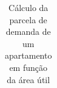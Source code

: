 \documentclass[12pt,openright,oneside,a4paper,brazil]{abntex2}
\begin{document}
\begin{table}[H] %
\centering

        \centering
        \caption{Cálculo da parcela de demanda de um apartamento em função da área útil}
        \label{tab:demanda_apartamento}
        \setlength{\tabcolsep}{9pt} %
        \renewcommand{\arraystretch}{1.2} %
        \vspace{0.15cm}
        \centering
        \small
        \begin{tabular}{c| c | c | c | c | c}
        \hline
        


\end{tabular}
\end{table}
\end{document}
